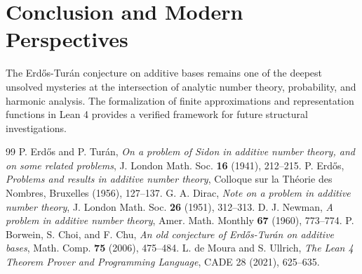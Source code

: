 \documentclass[11pt,a4paper]{article}
\theoremstyle{definition}
\begin{document}
\section{Conclusion and Modern Perspectives}
The Erd\H{o}s-Tur\'an conjecture on additive bases remains one of the deepest unsolved mysteries at the intersection of analytic number theory, probability, and harmonic analysis. The formalization of finite approximations and representation functions in Lean 4 provides a verified framework for future structural investigations.

\begin{thebibliography}{99}
 P. Erd\H{o}s and P. Tur\'an, \textit{On a problem of Sidon in additive number theory, and on some related problems}, J. London Math. Soc. \textbf{16} (1941), 212--215.
 P. Erd\H{o}s, \textit{Problems and results in additive number theory}, Colloque sur la Th\'eorie des Nombres, Bruxelles (1956), 127--137.
 G. A. Dirac, \textit{Note on a problem in additive number theory}, J. London Math. Soc. \textbf{26} (1951), 312--313.
 D. J. Newman, \textit{A problem in additive number theory}, Amer. Math. Monthly \textbf{67} (1960), 773--774.
 P. Borwein, S. Choi, and F. Chu, \textit{An old conjecture of Erd\H{o}s-Tur\'an on additive bases}, Math. Comp. \textbf{75} (2006), 475--484.
 L. de Moura and S. Ullrich, \textit{The Lean 4 Theorem Prover and Programming Language}, CADE 28 (2021), 625--635.
\end{thebibliography}
\end{document}
